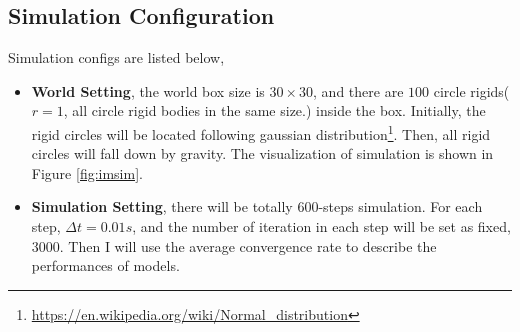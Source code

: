 \subsection{Simulation Configuration}
Simulation configs are listed below,
    \label{simconfig}
    \begin{itemize}
        \item \textbf{World Setting}, the world box size is $30\times30$,   and there are $100$ circle rigids($r=1$, all circle rigid bodies in the same size.) inside the box. Initially, the rigid circles will be located following gaussian distribution\footnote{\url{https://en.wikipedia.org/wiki/Normal_distribution}}. Then, all rigid circles will fall down by gravity. The visualization of simulation is shown in Figure \ref{fig:imsim}.
        \item \textbf{Simulation Setting}, there will be totally $600$-steps simulation. For each step, $\Delta t = 0.01s$, and the number of iteration in each step will be set as fixed, $3000$. Then I will use the average convergence rate to describe the performances of models.
    \end{itemize}
